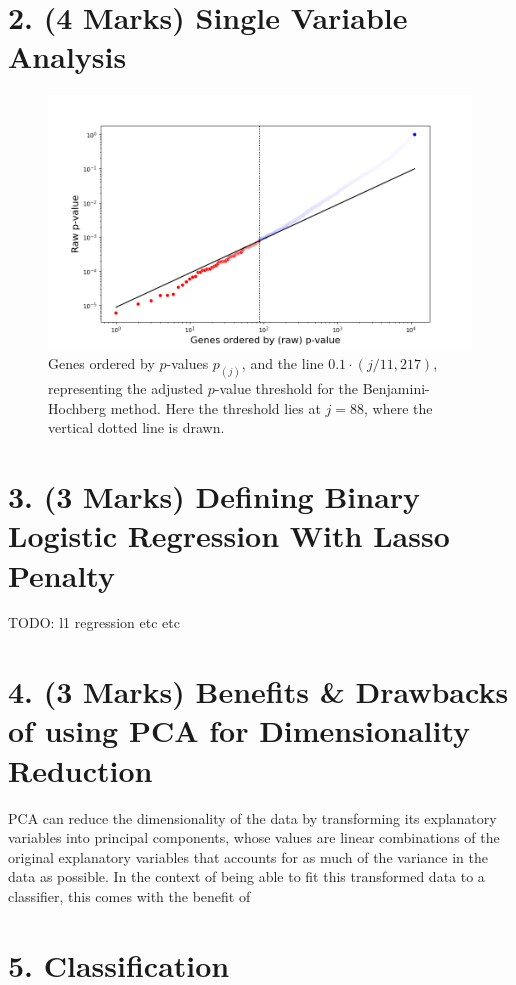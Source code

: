 \documentclass[twocolumn]{article}
\begin{document}
\section{2. (4 Marks) Single Variable Analysis}

\begin{figure}[H]
    \centering
    \includegraphics[width=\linewidth]{figures/SVA_Significant_Genes.png}
    \caption{Genes ordered by $p$-values $p_(j)$, and the line $0.1\cdot(j/11,217)$, representing the adjusted $p$-value threshold for the Benjamini-Hochberg method. Here the threshold lies at $j=88$, where the vertical dotted line is drawn.}
    \label{fig:bh-threshold}
\end{figure}

\section{3. (3 Marks) Defining Binary Logistic Regression With Lasso Penalty}
TODO: l1 regression etc etc

\section{4. (3 Marks) Benefits \& Drawbacks of using PCA for Dimensionality Reduction}
PCA can reduce the dimensionality of the data by transforming its explanatory variables into principal components, whose values are linear combinations of the original explanatory variables that accounts for as much of the variance in the data as possible. In the context of being able to fit this transformed data to a classifier, this comes with the benefit of 

\section{5. Classification}
\end{document}

